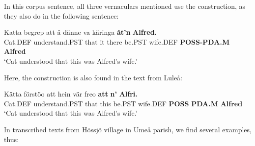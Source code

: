 {%
In this corpus sentence, all three vernaculars mentioned use the  construction, as they also do in the following sentence:


\ea\label{}
\gll Katta  begrep  att  ä  dänne  va  käringa  \textbf{åt’n} \textbf{Alfred.}\\
Cat.DEF  understand.PST  that  it  there  be.PST  wife.DEF  \textbf{POSS-PDA.M} \textbf{Alfred}\\
\glt ‘Cat understood that this was Alfred’s wife.’
\z

Here, the construction is also found in the text from Luleå:


\ea\label{}
\gll Kätta  förstöo  att  hein  vär  freo  \textbf{att}\textbf{  n’}\textbf{  Alfri.}\\
Cat.DEF  understand.PST  that  this  be.PST  wife.DEF  \textbf{POSS} \textbf{PDA.M} \textbf{Alfred}\\
\glt ‘Cat understood that this was Alfred’s wife.’
\z

In transcribed texts from Hössjö village in Umeå parish, we find several examples, thus:


\ea\label{}

\z 
\z

}
